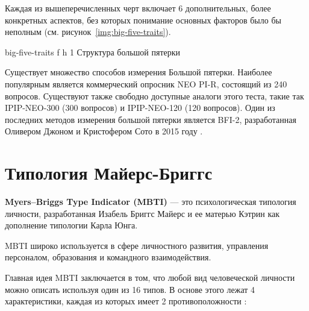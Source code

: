 Каждая из вышеперечисленных черт включает 6 дополнительных, более конкретных аспектов, без которых понимание основных факторов было бы неполным \cite{big_five_traits} (см. рисунок~\ref{img:big-five-traits}).

{big-five-traits} %
{f} %
{h} %
{1\textwidth} %
{Структура большой пятерки} %

Существует множество способов измерения Большой пятерки. 
Наиболее популярным является коммерческий опросник NEO PI-R, состоящий из 240 вопросов. 
Существуют также свободно доступные аналоги этого теста, такие так IPIP-NEO-300 (300 вопросов) и IPIP-NEO-120 (120 вопросов). Один из последних методов измерения большой пятерки является BFI-2, разработанная Оливером Джоном и Кристофером Сото в 2015 году \cite{big_five_inventory}.

\section{Типология Майерс-Бриггс}

\textbf{Myers--Briggs Type Indicator (MBTI)} --- это психологическая типология личности, разработанная Изабель Бриггс Майерс и ее матерью Кэтрин как дополнение типологии Карла Юнга.

MBTI широко используется в сфере личностного развития, управления персоналом, образования и командного взаимодействия.

Главная идея MBTI заключается в том, что любой вид человеческой личности можно описать используя один из 16 типов. В основе этого лежат 4 характеристики, каждая из которых имеет 2 противоположности \cite{Pittenger1993MeasuringMBTI}: 

